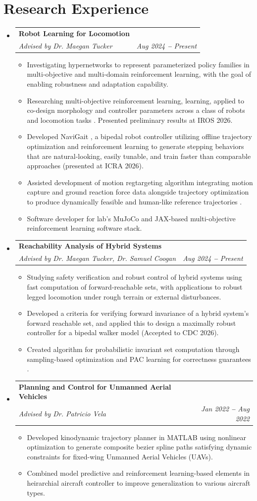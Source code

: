 \documentclass[letterpaper,11pt]{article}
\makeatletter
\newcommand{\resumeItem}[1]{
  \item\small{
    {#1 \vspace{-2pt}}
  }
}
\newcommand{\resumeSubheading}[4]{
  \vspace{-2pt}\item
    \begin{tabular*}{0.97\textwidth}[t]{l@{\extracolsep{\fill}}r}
      \textbf{#1} & #2 \\
      \textit{\small#3} & \textit{\small #4} \\
    \end{tabular*}\vspace{-7pt}
}
\newcommand{\resumeSubHeadingListStart}{\begin{itemize}[leftmargin=0.15in, label={}]}
\newcommand{\resumeSubHeadingListEnd}{\end{itemize}}
\newcommand{\resumeItemListStart}{\begin{itemize}}
\newcommand{\resumeItemListEnd}{\end{itemize}\vspace{-5pt}}
\makeatother
\begin{document}
\section{Research Experience}
  \vspace{3pt}
  \resumeSubHeadingListStart
    \resumeSubheading
      {Robot Learning for Locomotion}{}
      {Advised by Dr. Maegan Tucker}{Aug 2024 \textbf{--} Present}
      \resumeItemListStart
        \resumeItem{Investigating hypernetworks to represent parameterized policy families in multi-objective and multi-domain reinforcement learning, with the goal of enabling robustness and adaptation capability.}
        \resumeItem{Researching multi-objective reinforcement learning, learning, applied to co-design morphology and controller parameters across a class of robots and locomotion tasks \cite{madabushi2026mocha}. Presented preliminary results at IROS 2026.}
        \resumeItem{Developed NaviGait \cite{janwani2026navigait}, a bipedal robot controller utilizing offline trajectory optimization and reinforcement learning to generate stepping behaviors that are 
        natural-looking, easily tunable, and train faster than comparable approaches (presented at ICRA 2026).}
        \resumeItem{Assisted development of motion regtargeting algorithm integrating motion capture and ground reaction force data alongside trajectory
        optimization to produce dynamically feasible and human-like reference trajectories \cite{zhang2026kinodynamic}.}
        \resumeItem{Software developer for lab's MuJoCo and JAX-based multi-objective reinforcement learning software stack.}
      \resumeItemListEnd 
    \resumeSubheading
      {Reachability Analysis of Hybrid Systems}{}
      {Advised by Dr. Maegan Tucker, Dr. Samuel Coogan}{Aug 2024 \textbf{--} Present}
      \resumeItemListStart
        \resumeItem{Studying safety verification and robust control of hybrid systems using fast computation of forward-reachable sets, with applications to robust legged locomotion under rough terrain or external disturbances.}
        \resumeItem{Developed a criteria for verifying forward invariance of a hybrid system's forward reachable set, and applied this to design a maximally robust controller for a bipedal walker model \cite{madabushi2026differentiableinvariant} (Accepted to CDC 2026).}
        \resumeItem{Created algorithm for probabilistic invariant set computation through sampling-based optimization and PAC learning for correctness guarantees \cite{madabushi2026finitestep}.}
      \resumeItemListEnd 
    \resumeSubheading
      {Planning and Control for Unmanned Aerial Vehicles}{}
      {Advised by Dr. Patricio Vela}{Jan 2022 \textbf{--} Aug 2022}
        \resumeItemListStart
          \resumeItem{Developed kinodynamic trajectory planner in MATLAB using nonlinear optimization to generate composite bezier spline paths satisfying dynamic constraints for fixed-wing Unmanned Aerial Vehicles (UAVs).}
          \resumeItem{Combined model predictive and reinforcement learning-based elements in heirarchial aircraft controller to improve generalization to various aircraft types.}
    \resumeItemListEnd
  \resumeSubHeadingListEnd
\end{document}
